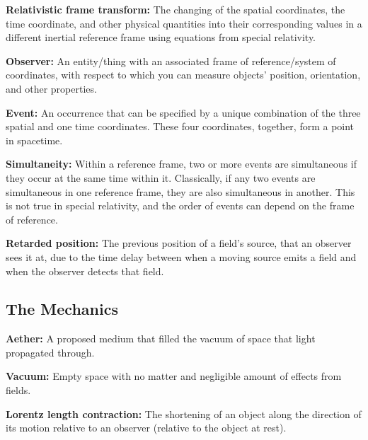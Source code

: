 \noindent \hypertarget{def-lorentz-transform}{\textbf{Relativistic frame transform:}}
The changing of the spatial coordinates, the time coordinate, and other physical quantities into their corresponding values in a different inertial reference frame using equations from special relativity.

\noindent \hypertarget{def-observer}{\textbf{Observer:}}
An entity/thing with an associated frame of reference/system of coordinates, with respect to which you can measure objects' position, orientation, and other properties.

\noindent \hypertarget{def-event}{\textbf{Event:}}
An occurrence that can be specified by a unique combination of the three spatial and one time coordinates. These four coordinates, together, form a point in spacetime.

\noindent \hypertarget{def-simultaneity}{\textbf{Simultaneity:}}
Within a reference frame, two or more events are simultaneous if they occur at the same time within it. Classically, if any two events are simultaneous in one reference frame, they are also simultaneous in another. This is not true in special relativity, and the order of events can depend on the frame of reference.

\noindent \hypertarget{def-retarded-position}{\textbf{Retarded position:}}
The previous position of a field's source, that an observer sees it at, due to the time delay between when a moving source emits a field and when the observer detects that field.

\subsection{The Mechanics}%

\noindent \hypertarget{def-aether}{\textbf{Aether:}}
A proposed medium that filled the vacuum of space that light propagated through.

\noindent \hypertarget{def-vacuum}{\textbf{Vacuum:}}
Empty space with no matter and negligible amount of effects from fields.

\noindent \hypertarget{def-length-contraction}{\textbf{Lorentz length contraction:}}
The shortening of an object along the direction of its motion relative to an observer (relative to the object at rest).

